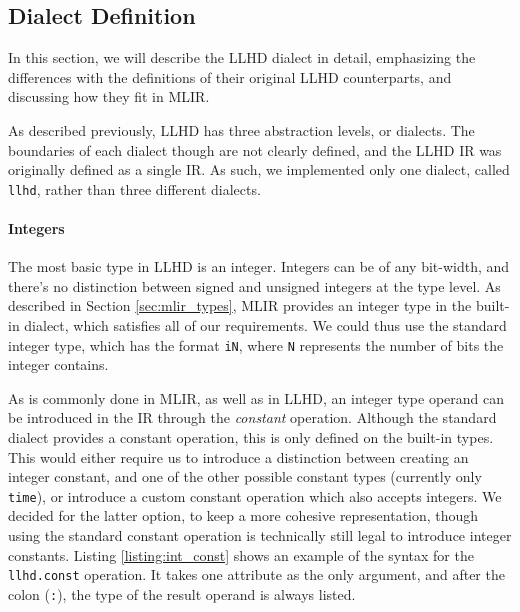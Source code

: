 
\subsection{Dialect Definition}
In this section, we will describe the LLHD dialect in detail, emphasizing the differences with the definitions of their original LLHD counterparts, and discussing how they fit in MLIR.

As described previously, LLHD has three abstraction levels, or dialects. The boundaries of each dialect though are not clearly defined, and the LLHD IR was originally defined as a single IR. As such, we implemented only one dialect, called \texttt{llhd}, rather than three different dialects.

\paragraph{Integers}
The most basic type in LLHD is an integer. Integers can be of any bit-width, and there's no distinction between signed and unsigned integers at the type level. As described in Section \ref{sec:mlir_types}, MLIR provides an integer type in the built-in dialect, which satisfies all of our requirements. We could thus use the standard integer type, which has the format \texttt{iN}, where \texttt{N} represents the number of bits the integer contains.

As is commonly done in MLIR, as well as in LLHD, an integer type operand can be introduced in the IR through the \textit{constant} operation. Although the standard dialect provides a constant operation, this is only defined on the built-in types. This would either require us to introduce a distinction between creating an integer constant, and one of the other possible constant types (currently only \texttt{time}), or introduce a custom constant operation which also accepts integers. We decided for the latter option, to keep a more cohesive representation, though using the standard constant operation is technically still legal to introduce integer constants. Listing \ref{listing:int_const} shows an example of the syntax for the \texttt{llhd.const} operation. It takes one attribute as the only argument, and after the colon (\texttt{:}), the type of the result operand is always listed.


